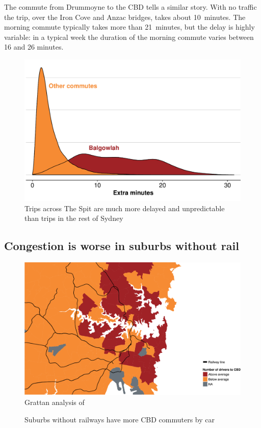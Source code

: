 \documentclass{grattan}
\begin{document}
The commute from Drummoyne to the CBD tells a similar story.
With no traffic the trip, over the Iron Cove and Anzac bridges, takes about 10~minutes.
The morning commute typically takes more than 21~minutes, but the delay is highly variable: in a typical week the duration of the morning commute varies between 16 and 26 minutes.


\begin{figure}
  \caption{Trips across The Spit are much more delayed and unpredictable than trips in the rest of Sydney}\label{fig:SpitReliability}
  \includegraphics{atlas/density-Balgowlah-vs-other-SYD-commutes--MonFri6-10-1.pdf}
\end{figure}


\subsection{Congestion is worse in suburbs without rail}

\begin{figure}
\caption{Suburbs without railways have more CBD commuters by car}\label{fig:above-below-average-n-drivers--InnerSydney}
\includegraphics[width=1.9\columnwidth]{atlas/chloropleth-n-drivers--Sydney-CBD-1-crop.pdf}
%
{Grattan analysis of \textcite{ABS2011Census}}
\end{figure}
\end{document}
